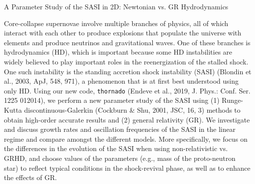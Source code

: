 \documentclass[11pt]{article}
\begin{document}
A Parameter Study of the SASI in 2D: Newtonian vs. GR Hydrodynamics\newline

Core-collapse supernovae involve multiple branches of physics, all of which interact with each other to produce explosions that populate the universe with elements and produce neutrinos and gravitational waves. One of these branches is hydrodynamics (HD), which is important because some HD instabilities are widely believed to play important roles in the reenergization of the stalled shock. One such instability is the standing accretion shock instability (SASI) (Blondin et al., 2003, ApJ, 548, 971), a phenomenon that is at first best understood using only HD. Using our new code, \texttt{thornado} (Endeve et al., 2019, J. Phys.: Conf. Ser. 1225 012014), we perform a new parameter study of the SASI using (1) Runge-Kutta discontinuous-Galerkin (Cockburn \& Shu, 2001, JSC, 16, 3) methods to obtain high-order accurate results and (2) general relativity (GR). We investigate and discuss growth rates and oscillation frequencies of the SASI in the linear regime and compare amongst the different models. More specifically, we focus on the differences in the evolution of the SASI when using non-relativistic vs. GRHD, and choose values of the parameters (e.g., mass of the proto-neutron star) to reflect typical conditions in the shock-revival phase, as well as to enhance the effects of GR.
\end{document}
